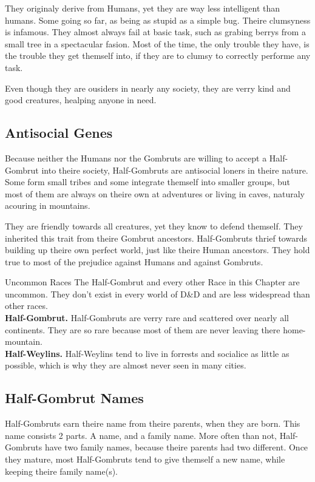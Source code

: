 \documentclass[10pt,twoside,twocolumn,openany]{book}
\begin{document}
They originaly derive from Humans, yet they are way less intelligent than humans. Some going so far, as being as stupid as a simple bug. Theire clumsyness is infamous. They almost always fail at basic task, such as grabing berrys from a small tree in a spectacular fasion. Most of the time, the only trouble they have, is the trouble they get themself into, if they are to clumsy to correctly performe any task.

Even though they are ousiders in nearly any society, they are verry kind and good creatures, healping anyone in need.

\subsection{Antisocial Genes}
Because neither the Humans nor the Gombruts are willing to accept a Half-Gombrut into theire society, Half-Gombruts are antisocial loners in theire nature. Some form small tribes and some integrate themself into smaller groups, but most of them are always on theire own at adventures or living in caves, naturaly acouring in mountains.

They are friendly towards all creatures, yet they know to defend themself. They inherited this trait from theire Gombrut ancestors. Half-Gombruts thrief towards building up theire own perfect world, just like theire Human ancestors. They hold true to most of the prejudice against Humans and against Gombruts. 

\newpage
\begin{commentbox}{Uncommon Races}
The Half-Gombrut and every other Race in this Chapter are uncommon. They don't exist in every world of D\&D and are less widespread than other races.\\
\textbf{Half-Gombrut.} Half-Gombruts are verry rare and scattered over nearly all continents. They are so rare because most of them are never leaving there home-mountain.\\
\textbf{Half-Weylins.} Half-Weylins tend to live in forrests and socialice as little as possible, which is why they are almost never seen in many cities.\\
\end{commentbox}

\subsection{Half-Gombrut Names}
Half-Gombruts earn theire name from theire parents, when they are born. This name consists 2 parts. A name, and a family name. More often than not, Half-Gombruts have two family names, because theire parents had two different. Once they mature, most Half-Gombruts tend to give themself a new name, while keeping theire family name(s).
\end{document}
